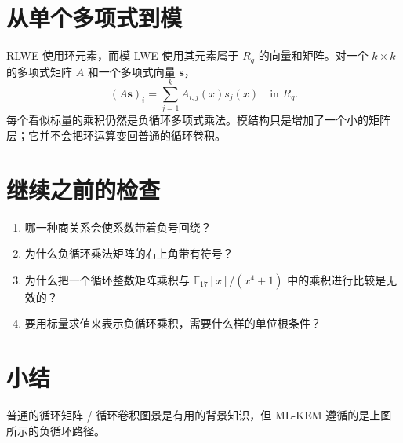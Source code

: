 \section{从单个多项式到模}

RLWE 使用环元素，而模 LWE 使用其元素属于 $R_q$ 的向量和矩阵。对一个 $k\times k$ 的多项式矩阵 $A$ 和一个多项式向量 $\mathbf{s}$，
\[
(A\mathbf{s})_i=\sum_{j=1}^{k}A_{i,j}(x)s_j(x)\quad\text{in }R_q.
\]
每个看似标量的乘积仍然是负循环多项式乘法。模结构只是增加了一个小的矩阵层；它并不会把环运算变回普通的循环卷积。

\section{继续之前的检查}

\begin{enumerate}
  \item 哪一种商关系会使系数带着负号回绕？
  \item 为什么负循环乘法矩阵的右上角带有符号？
  \item 为什么把一个循环整数矩阵乘积与 $\mathbb{F}_{17}[x]/(x^4+1)$ 中的乘积进行比较是无效的？
  \item 要用标量求值来表示负循环乘积，需要什么样的单位根条件？
\end{enumerate}

\section{小结}

\begin{center}
\end{center}

普通的循环矩阵 / 循环卷积图景是有用的背景知识，但 ML-KEM 遵循的是上图所示的负循环路径。

\printbibliography[heading=chapterrefs]

